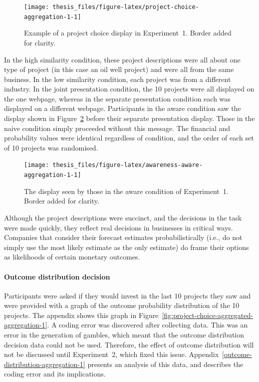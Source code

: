 \documentclass[a4paper, nobind, dvipsnames]{templates/ociamthesis}
\theoremstyle{definition}
\theoremstyle{definition}
\theoremstyle{definition}
\theoremstyle{definition}
\theoremstyle{remark}
\begin{document}
\begin{figure}
\texttt{[image: thesis\_files/figure-latex/project-choice-aggregation-1-1]} \caption{Example of a project choice display in Experiment~1. Border added for clarity.}\label{fig:project-choice-aggregation-1}
\end{figure}

In the high similarity condition, these project descriptions were all about one
type of project (in this case an oil well project) and were all from the same
business. In the low similarity condition, each project was from a different
industry. In the joint presentation condition, the 10 projects were all
displayed on the one webpage, whereas in the separate presentation condition
each was displayed on a different webpage. Participants in the aware condition
saw the display shown in Figure~\ref{fig:awareness-aware-aggregation-1} before
their separate presentation display. Those in the naive condition simply
proceeded without this message. The financial and probability values were
identical regardless of condition, and the order of each set of 10 projects was
randomised.



\begin{figure}
\texttt{[image: thesis\_files/figure-latex/awareness-aware-aggregation-1-1]} \caption{The display seen by those in the aware condition of Experiment~1. Border added for clarity.}\label{fig:awareness-aware-aggregation-1}
\end{figure}

Although the project descriptions were succinct, and the decisions in the task
were made quickly, they reflect real decisions in businesses in critical ways.
Companies that consider their forecast estimates probabilistically (i.e., do not
simply use the most likely estimate as the only estimate) do frame their options
as likelihoods of certain monetary outcomes.

\hypertarget{outcome-distribution-materials-aggregation-1}{%
\paragraph{Outcome distribution decision}\label{outcome-distribution-materials-aggregation-1}}

Participants were asked if they would invest in the last 10 projects they saw
and were provided with a graph of the outcome probability distribution of the 10
projects. The appendix shows this graph in
Figure~\ref{fig:project-choice-aggregated-aggregation-1}. A coding error was
discovered after collecting data. This was an error in the generation of
gambles, which meant that the outcome distribution decision data could not be
used. Therefore, the effect of outcome distribution will not be discussed until
Experiment~2, which fixed this issue.
Appendix~\ref{outcome-distribution-aggregation-1} presents an analysis of this
data, and describes the coding error and its implications.
\end{document}
